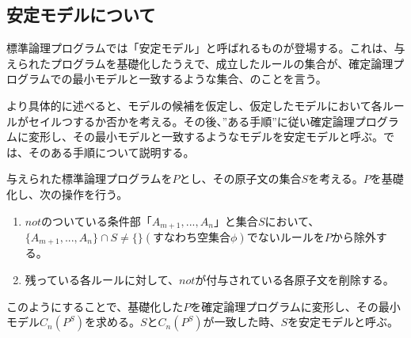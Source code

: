 \documentclass[dvipdfmx]{jsarticle}
\begin{document}
\subsection{安定モデルについて}
標準論理プログラムでは「安定モデル」と呼ばれるものが登場する。これは、与えられたプログラムを基礎化したうえで、成立したルールの集合が、確定論理プログラムでの最小モデルと一致するような集合、のことを言う。\par
より具体的に述べると、モデルの候補を仮定し、仮定したモデルにおいて各ルールがセイルつするか否かを考える。その後、”ある手順”に従い確定論理プログラムに変形し、その最小モデルと一致するようなモデルを安定モデルと呼ぶ。では、そのある手順について説明する。\par
与えられた標準論理プログラムを$P$とし、その原子文の集合$S$を考える。$P$を基礎化し、次の操作を行う。
\begin{enumerate}
  \item $not$のついている条件部「$A_{m+1}, ..., A_{n}$」と集合$S$において、$\{A_{m+1}, ..., A_{n}\} \cap S \neq \{\}(すなわち空集合\phi)$でないルールを$P$から除外する。
  \item 残っている各ルールに対して、$not$が付与されている各原子文を削除する。
\end{enumerate}
このようにすることで、基礎化した$P$を確定論理プログラムに変形し、その最小モデル$C_{n}(P^{S})$を求める。$S$と$C_{n}(P^{S})$が一致した時、$S$を安定モデルと呼ぶ。
\end{document}
